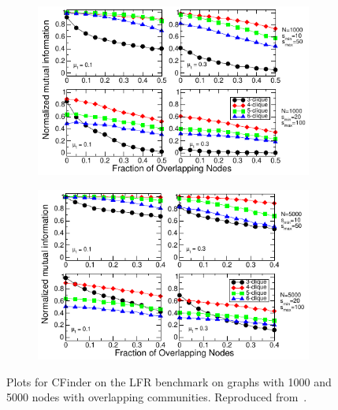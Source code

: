 %
%
\begin{figure}[h!]
    \centering
    \begin{subfigure}{0.5\textwidth}
    \centering
    \includegraphics[width=\cfinderwidth]{lfrpaper/fig6.pdf}
    \end{subfigure}%
    \begin{subfigure}{0.5\textwidth}
    \centering
    \includegraphics[width=\cfinderwidth]{lfrpaper/fig7.pdf}
    \end{subfigure}%
    \caption{
        Plots for CFinder on the LFR benchmark on graphs with 1000 and 5000 nodes 
		with overlapping communities. Reproduced from~\cite{LF09}.
    }\label{fig:CFinder_overlapping}
\end{figure}



